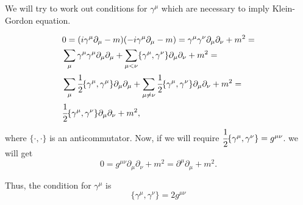 \documentclass[main.tex]{subfiles}
\begin{document}
We will try to work out conditions for $\gamma^\mu$ which are necessary to imply Klein-Gordon equation.

\begin{align*}
& 0 = (i\gamma^\mu \partial_\mu - m)(-i\gamma^\mu \partial_\mu - m) = \gamma^\mu\gamma^\nu \partial_\mu \partial_\nu + m^2 = \\
& \sum_{\mu} \gamma^\mu\gamma^\mu\partial_\mu\partial_\mu + \sum_{\mu < \nu} \{\gamma^\mu, \gamma^\nu\} \partial_\mu\partial_\nu + m^2 = \\
& \sum_{\mu} \cfrac{1}{2}\{\gamma^\mu, \gamma^\mu\} \partial_\mu\partial_\mu + \sum_{\mu \not= \nu} \cfrac{1}{2}\{\gamma^\mu, \gamma^\nu\} \partial_\mu\partial_\nu + m^2 = \\
& \cfrac{1}{2}\{\gamma^\mu, \gamma^\nu\} \partial_\mu \partial_\nu + m^2,
\end{align*}
where $\{\cdot,\cdot\}$ is an anticommutator. Now, if we will require
$\cfrac{1}{2}\{\gamma^\mu, \gamma^\nu\} = g^{\mu\nu}$.
we will get 
\begin{equation}
0 = g^{\mu\nu}\partial_\mu\partial_\nu + m^2 = \partial^\mu\partial_\mu + m^2.
\end{equation}

Thus, the condition for $\gamma^\mu$ is
\begin{equation}
\boxed{
\{\gamma^\mu, \gamma^\nu\} = 2g^{\mu\nu}
}
\end{equation}
\end{document}
